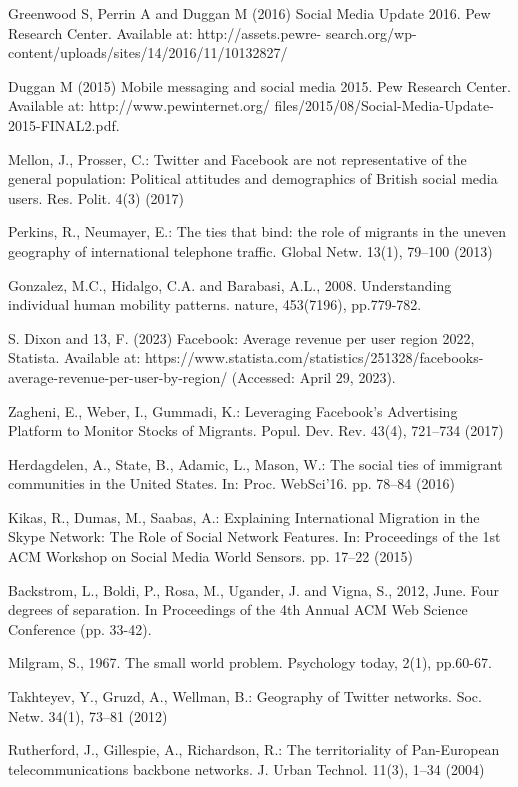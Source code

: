 \documentclass[12pt]{article}
\begin{document}
Greenwood S, Perrin A and Duggan M (2016) Social Media Update
2016. Pew Research Center. Available at: http://assets.pewre-
search.org/wp-content/uploads/sites/14/2016/11/10132827/

Duggan M (2015) Mobile messaging and social media 2015. Pew
Research Center. Available at: http://www.pewinternet.org/
files/2015/08/Social-Media-Update-2015-FINAL2.pdf.

Mellon, J., Prosser, C.: Twitter and Facebook are not representative of the general
population: Political attitudes and demographics of British social media users. Res.
Polit. 4(3) (2017)

Perkins, R., Neumayer, E.: The ties that bind: the role of migrants in the uneven
geography of international telephone traffic. Global Netw. 13(1), 79–100 (2013)

Gonzalez, M.C., Hidalgo, C.A. and Barabasi, A.L., 2008. Understanding individual human mobility patterns. nature, 453(7196), pp.779-782.

S. Dixon and 13, F. (2023) Facebook: Average revenue per user region 2022, Statista. Available at: https://www.statista.com/statistics/251328/facebooks-average-revenue-per-user-by-region/ (Accessed: April 29, 2023). 

Zagheni, E., Weber, I., Gummadi, K.: Leveraging Facebook’s Advertising Platform
to Monitor Stocks of Migrants. Popul. Dev. Rev. 43(4), 721–734 (2017)

Herdagdelen, A., State, B., Adamic, L., Mason, W.: The social ties of immigrant
communities in the United States. In: Proc. WebSci’16. pp. 78–84 (2016)

Kikas, R., Dumas, M., Saabas, A.: Explaining International Migration in the Skype
Network: The Role of Social Network Features. In: Proceedings of the 1st ACM
Workshop on Social Media World Sensors. pp. 17–22 (2015)

Backstrom, L., Boldi, P., Rosa, M., Ugander, J. and Vigna, S., 2012, June. Four degrees of separation. In Proceedings of the 4th Annual ACM Web Science Conference (pp. 33-42).

Milgram, S., 1967. The small world problem. Psychology today, 2(1), pp.60-67.

Takhteyev, Y., Gruzd, A., Wellman, B.: Geography of Twitter networks. Soc. Netw.
34(1), 73–81 (2012)

Rutherford, J., Gillespie, A., Richardson, R.: The territoriality of Pan-European
telecommunications backbone networks. J. Urban Technol. 11(3), 1–34 (2004)
\end{document}
